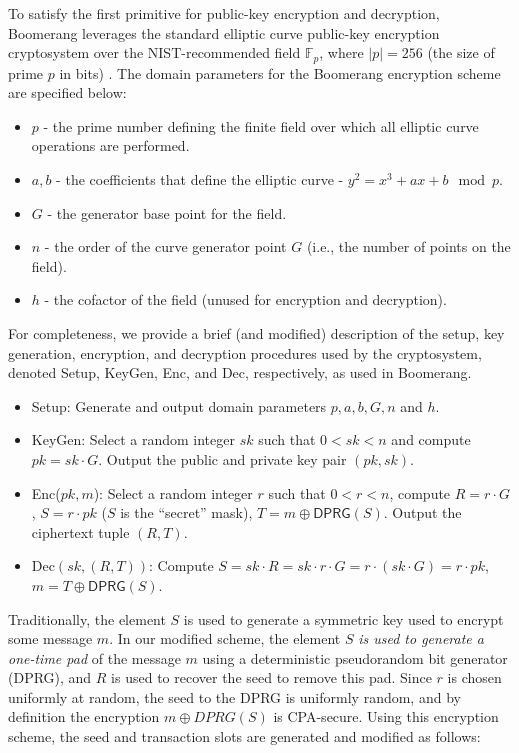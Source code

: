 To satisfy the first primitive for public-key encryption and decryption, Boomerang leverages the standard elliptic curve public-key  encryption cryptosystem over the NIST-recommended field $\mathbb{F}_{p}$, where $|p| = 256$ (the size of prime $p$ in bits) \cite{nist-curves}. The domain parameters for the Boomerang encryption scheme are specified below:
\begin{itemize}
	\item $p$ - the prime number defining the finite field over which all elliptic curve operations are performed.
	\item $a, b$ - the coefficients that define the elliptic curve - $y^2 = x^3 +ax + b \mod p$.
	\item $G$ - the generator base point for the field.
	\item $n$ - the order of the curve generator point $G$ (i.e., the number of points on the field).
	\item $h$ - the cofactor of the field (unused for encryption and decryption).
\end{itemize}
For completeness, we provide a brief (and modified) description of the setup, key generation, encryption, and decryption procedures used by the cryptosystem, denoted {\sf Setup}, {\sf KeyGen}, {\sf Enc}, and {\sf Dec}, respectively, as used in Boomerang. 
\begin{itemize}
	\item {\sf Setup}: Generate and output domain parameters $p,a,b,G,n$ and $h$. 
	\item {\sf KeyGen}: Select a random integer $sk$ such that $0 < sk < n$ and compute $pk = sk \cdot G$. Output the public and private key pair $(pk, sk)$.
	\item {\sf Enc}($pk, m$): Select a random integer $r$ such that $0 < r < n$, compute $R = r \cdot G$, $S = r \cdot pk$ ($S$ is the ``secret'' mask), $T = m \oplus \mathsf{DPRG}(S)$. Output the ciphertext tuple $(R, T)$.
	\item {\sf Dec}$(sk, (R, T))$: Compute $S = sk \cdot R = sk \cdot r \cdot G = r \cdot (sk \cdot G) = r \cdot pk$, $m = T \oplus \mathsf{DPRG}(S)$.
\end{itemize}
Traditionally, the element $S$ is used to generate a symmetric key used to encrypt some message $m$. In our modified scheme, the element $S$ \emph{is used to generate a one-time pad} of the message $m$ using a deterministic pseudorandom bit generator (DPRG), and $R$ is used to recover the seed to remove this pad. Since $r$ is chosen uniformly at random, the seed to the DPRG is uniformly random, and by definition the encryption $m \oplus DPRG(S)$ is CPA-secure. Using this encryption scheme, the seed and transaction slots are generated and modified as follows:
